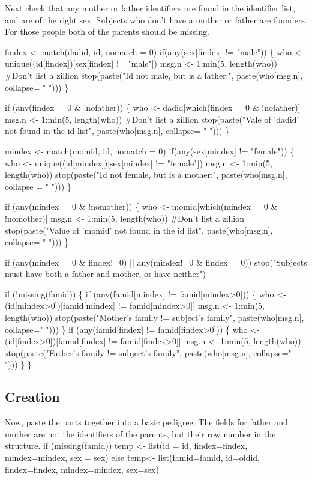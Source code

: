 \documentclass{article}
\begin{document}
Next check that any mother or father identifiers are found in the identifier
list, and are of the right sex.
Subjects who don't have a mother or father are founders.  For those people %
both of the parents should be missing.

\nwenddocs{}\endmoddef
findex <- match(dadid, id, nomatch = 0)
if(any(sex[findex] != "male")) \{
    who <- unique((id[findex])[sex[findex] != "male"])
    msg.n <- 1:min(5, length(who))  #Don't list a zillion
    stop(paste("Id not male, but is a father:", 
               paste(who[msg.n], collapse= " ")))
    \}

if (any(findex==0 & !nofather)) \{
    who <- dadid[which(findex==0 & !nofather)]
    msg.n <- 1:min(5, length(who))  #Don't list a zillion
    stop(paste("Vale of 'dadid' not found in the id list", 
               paste(who[msg.n], collapse= " ")))
    \}
    
mindex <- match(momid, id, nomatch = 0)
if(any(sex[mindex] != "female")) \{
    who <- unique((id[mindex])[sex[mindex] != "female"])
    msg.n <- 1:min(5, length(who))
    stop(paste("Id not female, but is a mother:", 
               paste(who[msg.n], collapse = " ")))
    \}

if (any(mindex==0 & !nomother)) \{
    who <- momid[which(mindex==0 & !nomother)]
    msg.n <- 1:min(5, length(who))  #Don't list a zillion
    stop(paste("Value of 'momid' not found in the id list", 
               paste(who[msg.n], collapse= " ")))
    \}

if (any(mindex==0 & findex!=0) || any(mindex!=0 & findex==0))
    stop("Subjects must have both a father and mother, or have neither")

if (!missing(famid)) \{
    if (any(famid[mindex] != famid[mindex>0])) \{
        who <- (id[mindex>0])[famid[mindex] != famid[mindex>0]]
        msg.n <- 1:min(5, length(who))
        stop(paste("Mother's family != subject's family", 
                   paste(who[msg.n], collapse=" ")))
        \}
    if (any(famid[findex] != famid[findex>0])) \{
        who <- (id[findex>0])[famid[findex] != famid[findex>0]]
        msg.n <- 1:min(5, length(who))
        stop(paste("Father's family != subject's family", 
                   paste(who[msg.n], collapse=" ")))
        \}
    \}
\nwendcode{}\nwdocspar

\subsection{Creation}
Now, paste the parts together into a basic pedigree.
The fields for father and mother are not the identifiers of
the parents, but their row number in the structure.
\nwenddocs{}\endmoddef
if (missing(famid))
    temp <- list(id = id, findex=findex, mindex=mindex, sex = sex)
else temp<- list(famid=famid, id=oldid, findex=findex, mindex=mindex, 
                 sex=sex)
\nwendcode{}\nwdocspar
\end{document}
